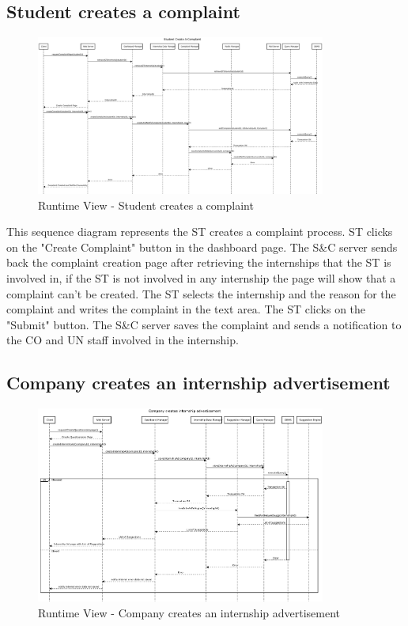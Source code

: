 \subsection{Student creates a complaint}
\label{sub:student-creates-a-complaint}%

\begin{figure}[H]
      \centering
      \includegraphics[width=0.85\textwidth]{Images/RV_05.pdf}
      \caption{Runtime View - Student creates a complaint}
      \label{fig:rv-student-creates-a-complaint}
\end{figure}

\par This sequence diagram represents the ST creates a complaint process. ST clicks on the "Create Complaint" button in the
dashboard page. The S\&C server sends back the complaint creation page after retrieving the internships that the ST is involved in,
if the ST is not involved in any internship the page will show that a complaint can't be created. The ST selects the internship
and the reason for the complaint and writes the complaint in the text area. The ST clicks on the "Submit" button. The S\&C server
saves the complaint and sends a notification to the CO and UN staff involved in the internship.

\subsection{Company creates an internship advertisement}
\label{sub:company-creates-an-internship-advertisement}%

\begin{figure}[H]
      \centering
      \includegraphics[width=0.85\textwidth]{Images/RV_06.pdf}
      \caption{Runtime View - Company creates an internship advertisement}
      \label{fig:rv-company-creates-an-internship-advertisement}
\end{figure}

